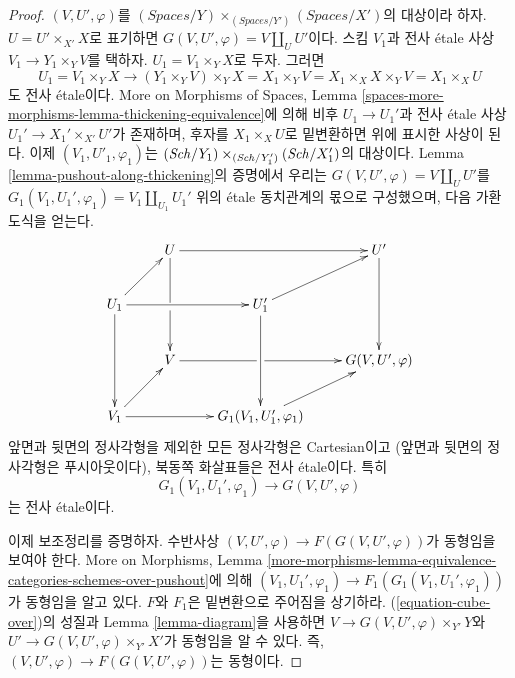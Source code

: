 \begin{proof}
\medskip\noindent
$(V, U', \varphi)$를
$(\textit{Spaces}/Y) \times_{(\textit{Spaces}/Y')} (\textit{Spaces}/X')$의
대상이라 하자. $U = U' \times_{X'} X$로 표기하면
$G(V, U', \varphi) = V \amalg_U U'$이다.
스킴 $V_1$과 전사 \'etale 사상
$V_1 \to Y_1 \times_Y V$를 택하자. $U_1 = V_1 \times_Y X$로 두자.
그러면
$$
U_1 = V_1 \times_Y X
\longrightarrow
(Y_1 \times_Y V) \times_Y X =
X_1 \times_Y V = X_1 \times_X X \times_Y V = X_1 \times_X U
$$
도 전사 \'etale이다. More on Morphisms of Spaces, Lemma
\ref{spaces-more-morphisms-lemma-thickening-equivalence}에 의해
비후 $U_1 \to U_1'$과 전사 \'etale 사상
$U_1' \to X_1' \times_{X'} U'$가 존재하며, 후자를
$X_1 \times_X U$로 밑변환하면 위에 표시한 사상이 된다.
이제 $(V_1, U'_1, \varphi_1)$는
$(\mathit{Sch}/Y_1) \times_{(\mathit{Sch}/Y_1')} (\mathit{Sch}/X_1')$의 대상이다.
Lemma \ref{lemma-pushout-along-thickening}의 증명에서 우리는
$G(V, U', \varphi) = V \amalg_U U'$를
$G_1(V_1, U_1', \varphi_1) = V_1 \amalg_{U_1} U_1'$ 위의
\'etale 동치관계의 몫으로 구성했으며, 다음 가환도식을 얻는다.
\begin{equation}
\label{equation-cube-over}
\vcenter{
\xymatrix{
& U \ar[rr] \ar'[d][dd] & & U' \ar[dd] \\
U_1 \ar[rr] \ar[dd] \ar[ru] & & U_1' \ar[dd] \ar[ru] & \\
& V \ar'[r][rr] & & G(V, U', \varphi) \\
V_1 \ar[rr] \ar[ru] & & G_1(V_1, U_1', \varphi_1) \ar[ru]
}
}
\end{equation}
앞면과 뒷면의 정사각형을 제외한 모든 정사각형은 Cartesian이고
(앞면과 뒷면의 정사각형은 푸시아웃이다), 북동쪽 화살표들은
전사 \'etale이다. 특히
$$
G_1(V_1, U_1', \varphi_1) \to G(V, U', \varphi)
$$
는 전사 \'etale이다.

\medskip\noindent
이제 보조정리를 증명하자. 수반사상
$(V, U', \varphi) \to F(G(V, U', \varphi))$가 동형임을 보여야 한다.
More on Morphisms, Lemma
\ref{more-morphisms-lemma-equivalence-categories-schemes-over-pushout}에 의해
$(V_1, U_1', \varphi_1) \to F_1(G_1(V_1, U_1', \varphi_1))$가
동형임을 알고 있다. $F$와 $F_1$은 밑변환으로 주어짐을 상기하라.
(\ref{equation-cube-over})의 성질과 Lemma \ref{lemma-diagram}을 사용하면
$V \to G(V, U', \varphi) \times_{Y'} Y$와
$U' \to G(V, U', \varphi) \times_{Y'} X'$가 동형임을 알 수 있다.
즉, $(V, U', \varphi) \to F(G(V, U', \varphi))$는 동형이다.
\end{proof}

